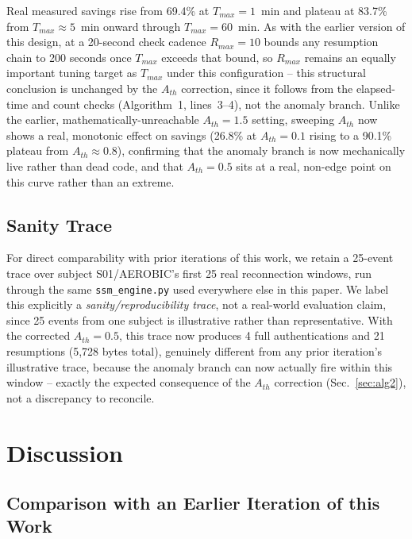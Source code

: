 \documentclass[conference]{IEEEtran}
\begin{document}
Real measured savings rise from 69.4\% at $T_{max}=1$~min and plateau at
83.7\% from $T_{max}\approx5$~min onward through $T_{max}=60$~min. As with
the earlier version of this design, at a 20-second check cadence
$R_{max}=10$ bounds any resumption chain to 200 seconds once $T_{max}$
exceeds that bound, so $R_{max}$ remains an equally important tuning
target as $T_{max}$ under this configuration -- this structural conclusion
is unchanged by the $A_{th}$ correction, since it follows from the
elapsed-time and count checks (Algorithm~1, lines~3--4), not the anomaly
branch. Unlike the earlier, mathematically-unreachable $A_{th}=1.5$
setting, sweeping $A_{th}$ now shows a real, monotonic effect on savings
(26.8\% at $A_{th}=0.1$ rising to a 90.1\% plateau from $A_{th}\approx0.8$),
confirming that the anomaly branch is now mechanically live rather than
dead code, and that $A_{th}=0.5$ sits at a real, non-edge point on this
curve rather than an extreme.

\subsection{Sanity Trace}
\label{sec:sanity}

For direct comparability with prior iterations of this work, we retain a
25-event trace over subject S01/AEROBIC's first 25 real reconnection
windows, run through the same \texttt{ssm\_engine.py} used everywhere else
in this paper. We label this explicitly a \emph{sanity/reproducibility
trace}, not a real-world evaluation claim, since 25 events from one subject
is illustrative rather than representative. With the corrected
$A_{th}=0.5$, this trace now produces 4 full authentications and 21
resumptions (5{,}728 bytes total), genuinely different from any prior
iteration's illustrative trace, because the anomaly branch can now actually
fire within this window -- exactly the expected consequence of the
$A_{th}$ correction (Sec.~\ref{sec:alg2}), not a discrepancy to reconcile.

\section{Discussion}

\subsection{Comparison with an Earlier Iteration of this Work}
\label{sec:audit}
\end{document}
